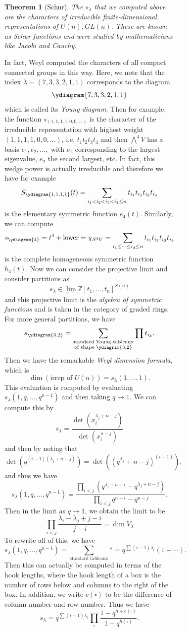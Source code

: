 \documentclass[leqno, openany]{memoir}
\newtheorem{thm}{Theorem}[section]
\theoremstyle{definition}
\theoremstyle{remark}
\theoremstyle{plain}
\theoremstyle{definition}
\theoremstyle{remark}
\newcommand{\Z}{\mathbb{Z}}
\begin{document}
\begin{figure}[H]
\begin{figure}[H]
\begin{thm}[Schur] The $s_{\lambda}$ that we computed above are the characters
    of irreducible finite-dimensional representations of $U(n), GL(n)$. These
    are known as \textit{Schur functions} and were studied by mathematicians
    like Jacobi and Cauchy.  \end{thm}

In fact, Weyl computed the characters of all compact connected groups in this
way. Here, we note that the index $\lambda = (7, 3, 3, 2, 1, 1)$ corresponds to
the diagram \[ \ydiagram{7,3,3,2,1,1} \] which is called its \textit{Young
diagram}. Then for example, the function $s_{(1,1,1,1,0,0,\ldots)}$ is the
character of the irreducible representation with highest weight
$(1,1,1,1,0,0,\ldots)$, i.e. $t_1 t_2 t_3 t_4$ and then $\bigwedge^4 V$ has a
basis $e_1, e_2, \ldots, $ with $e_1$ corresponding to the largest eigenvalue,
$e_2$ the second largest, etc. In fact, this wedge power is actually
irreducible and therefore we have for example \[ S_{\tiny\ydiagram{1,1,1,1}}(t)
    = \sum_{i_1 < i_2 < i_3 < i_4 \leq n} t_{i_1} t_{i_2} t_{i_3} t_{i_4} \] is
    the elementary symmetric function $e_4(t)$. Similarly, we can compute \[
    s_{\tiny\ydiagram{4}} = t^4 + \text{lower} = \chi_{S^4 V} = \sum_{i_1 \leq
\cdots \leq i_4 \leq n} t_{i_1} t_{i_2} t_{i_3} t_{i_4} \] is the complete
homogeneous symmetric function $h_4(t)$. Now we can consider the projective
limit and consider partitions as \[ s_{\lambda} \in \lim_{\gets} \Z[t_1,
\ldots, t_n]^{S(n)} \] and this projective limit is the \textit{algebra of
symmetric functions} and is taken in the category of graded rings. For more
general partitions, we have \[ s_{\tiny\ydiagram{3,2}} =
\sum_{\substack{\text{standard Young tableaux} \\ \text{of shape }
\tiny\ydiagram{3,2}}} \prod t_{i_k}. \] Then we have the remarkable
\textit{Weyl dimension formula}, which is \[ \dim (\text{irrep of $U(n)$}) =
s_{\lambda}(1, \ldots, 1). \] This evaluation is computed by evaluating
$s_{\lambda}(1, q, \ldots, q^{n-1})$ and then taking $q \to 1$. We can compute
this by \[ s_{\lambda} = \frac{\det (x_i^{\lambda_j + n - j})}{\det(x_i^{n-j})}
    \] and then by noting that \[ \det (q^{(i-1)(\lambda_j + n - j)}) = \det(
    (q^{\lambda_j} + n-j)^{(i-1)} ), \] and thus we have \[ s_{\lambda}(1, q,
\ldots, q^{n-1}) = \frac{\prod_{i<j} (q^{\lambda_i+n-i} - q^{\lambda_j +
n-j})}{\prod_{i<j} q^{n-i} - q^{n-j}}. \] Then in the limit as $q \to 1$, we
obtain the limit to be \[ \prod_{i < j} \frac{\lambda_i - \lambda_j + j -
    i}{j-i} = \dim V_{\lambda} \] To rewrite all of this, we have \[
s_{\lambda}(1, q, \ldots, q^{n-1}) = \sum_{\text{standard tableaux}} * =
q^{\sum(i-1)\lambda_i} (1 + \cdots). \] Then this can actually be computed in
terms of the hook lengths, where the hook length of a box is the number of rows
below and columns to the right of the box. In addition, we write $c(\square)$
to be the difference of column number and row number. Thus we have \[
s_{\lambda} = q^{\sum (i-1)\lambda_i} \prod_{\square} \frac{1 - q^{n +
c(\square)}}{1 - q^{h(\square)}}. \]


\end{figure}
\end{figure}
\end{document}
